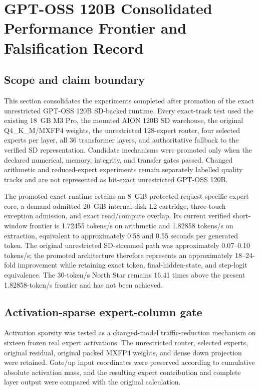\section{GPT-OSS 120B Consolidated Performance Frontier and Falsification Record}
\label{sec:gptoss120b-frontier-consolidation-20260911}

\subsection{Scope and claim boundary}

This section consolidates the experiments completed after promotion of the
exact unrestricted GPT-OSS 120B SD-backed runtime.  Every exact-track test used
the existing 18~GB M3 Pro, the mounted AION 120B SD warehouse, the original
Q4\_K\_M/MXFP4 weights, the unrestricted 128-expert router, four selected
experts per layer, all 36 transformer layers, and authoritative fallback to the
verified SD representation.  Candidate mechanisms were promoted only when the
declared numerical, memory, integrity, and transfer gates passed.  Changed
arithmetic and reduced-expert experiments remain separately labelled quality
tracks and are not represented as bit-exact unrestricted GPT-OSS 120B.

The promoted exact runtime retains an 8~GiB protected request-specific expert
core, a demand-admitted 20~GiB internal-disk L2 cartridge, three-touch exception
admission, and exact read/compute overlap.  Its current verified short-window
frontier is 1.72455 tokens/s on arithmetic and 1.82858 tokens/s on extraction,
equivalent to approximately 0.58 and 0.55 seconds per generated token.  The
original unrestricted SD-streamed path was approximately 0.07--0.10 tokens/s;
the promoted architecture therefore represents an approximately 18--24-fold
improvement while retaining exact token, final-hidden-state, and step-logit
equivalence.  The 30-token/s North Star remains 16.41 times above the present
1.82858-token/s frontier and has not been achieved.

\subsection{Activation-sparse expert-column gate}

Activation sparsity was tested as a changed-model traffic-reduction mechanism
on sixteen frozen real expert activations.  The unrestricted router, selected
experts, original residual, original packed MXFP4 weights, and dense down
projection were retained.  Gate/up input coordinates were preserved according
to cumulative absolute activation mass, and the resulting expert contribution
and complete layer output were compared with the original calculation.

